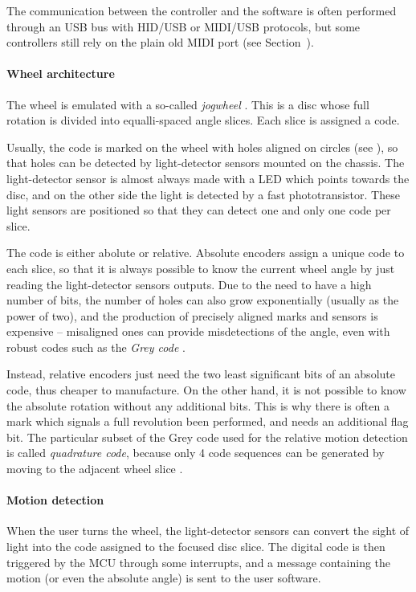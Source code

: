 \documentclass[a4paper,10pt]{article}
\begin{document}
\begin{multicols}{2}
The communication between the controller and the software is often performed
through an USB bus with HID/USB or MIDI/USB protocols, but some controllers
still rely on the plain old MIDI port (see Section~\CITEME).


\paragraph{Wheel architecture}
The wheel is emulated with a so-called \emph{jogwheel} \INSFIG. This is a disc
whose full rotation is divided into equalli-spaced angle slices. Each slice is
assigned a code.

Usually, the code is marked on the wheel with holes aligned on circles (see
\INSFIG), so that holes can be detected by light-detector sensors mounted on
the chassis. The light-detector sensor is almost always made with a LED which
points towards the disc, and on the other side the light is detected by a fast
phototransistor. These light sensors are positioned so that they can detect
one and only one code per slice.

The code is either abolute or relative. Absolute encoders assign a unique code
to each slice, so that it is always possible to know the current wheel angle
by just reading the light-detector sensors outputs. Due to the need to have a
high number of bits, the number of holes can also grow exponentially (usually
as the power of two), and the production of precisely aligned marks and
sensors is expensive -- misaligned ones can provide misdetections of the
angle, even with robust codes such as the \emph{Grey code} \CITEME.

Instead, relative encoders just need the two least significant bits of an
absolute code, thus cheaper to manufacture. On the other hand, it is not
possible to know the absolute rotation without any additional bits. This is
why there is often a mark which signals a full revolution been performed, and
needs an additional flag bit. The particular subset of the Grey code used for
the relative motion detection is called \emph{quadrature code}, because only 4
code sequences can be generated by moving to the adjacent wheel slice \CITEME.


\paragraph{Motion detection}
When the user turns the wheel, the light-detector sensors can convert the
sight of light into the code assigned to the focused disc slice. The digital
code is then triggered by the MCU through some interrupts, and a message
containing the motion (or even the absolute angle) is sent to the user
software.


\end{multicols}
\end{document}
